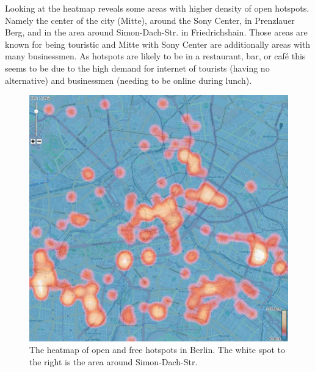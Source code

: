 Looking at the heatmap reveals some areas with higher density of open hotspots.
Namely the center of the city (Mitte), around the Sony Center, in Prenzlauer Berg, and
in the area around Simon-Dach-Str. in Friedrichshain.
Those areas are known for being touristic and Mitte with Sony Center are additionally
areas with many businessmen.
As hotspots are likely to be in a restaurant, bar, or caf\'{e}
this seems to be due to the high demand for internet
of tourists (having no alternative) and businessmen (needing to
be online during lunch).

\begin{figure}
\centering
\includegraphics[width=0.9\linewidth]{imgs/heat}
\caption{The heatmap of open and free hotspots in Berlin.
The white spot to the right is the area around Simon-Dach-Str.}
\label{fig:heat}
\end{figure}
